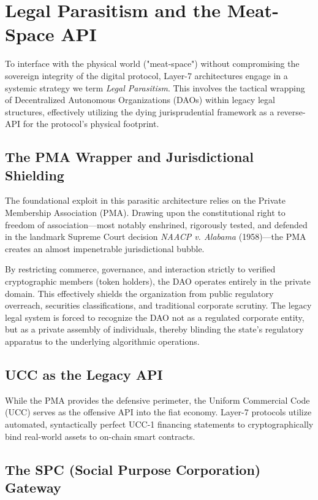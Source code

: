 \chapter{Legal Parasitism and the Meat-Space API}
\label{ch:legal_parasitism}

To interface with the physical world ("meat-space") without compromising the sovereign integrity of the digital protocol, Layer-7 architectures engage in a systemic strategy we term \textit{Legal Parasitism}. This involves the tactical wrapping of Decentralized Autonomous Organizations (DAOs) within legacy legal structures, effectively utilizing the dying jurisprudential framework as a reverse-API for the protocol's physical footprint.

\section{The PMA Wrapper and Jurisdictional Shielding}

The foundational exploit in this parasitic architecture relies on the Private Membership Association (PMA). Drawing upon the constitutional right to freedom of association---most notably enshrined, rigorously tested, and defended in the landmark Supreme Court decision \textit{NAACP v. Alabama} (1958)---the PMA creates an almost impenetrable jurisdictional bubble. 

By restricting commerce, governance, and interaction strictly to verified cryptographic members (token holders), the DAO operates entirely in the private domain. This effectively shields the organization from public regulatory overreach, securities classifications, and traditional corporate scrutiny. The legacy legal system is forced to recognize the DAO not as a regulated corporate entity, but as a private assembly of individuals, thereby blinding the state's regulatory apparatus to the underlying algorithmic operations.

\section{UCC as the Legacy API}

While the PMA provides the defensive perimeter, the Uniform Commercial Code (UCC) serves as the offensive API into the fiat economy. Layer-7 protocols utilize automated, syntactically perfect UCC-1 financing statements to cryptographically bind real-world assets to on-chain smart contracts.

\section{The SPC (Social Purpose Corporation) Gateway}

